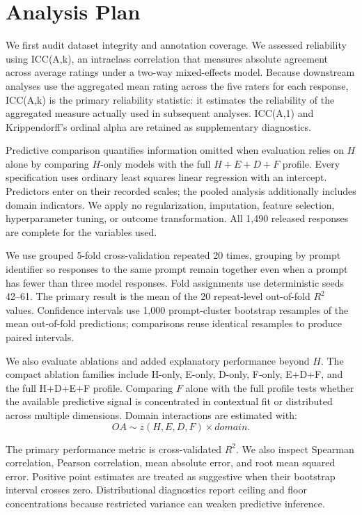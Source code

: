 \documentclass[manuscript,review,anonymous]{acmart}
\begin{document}
\section{Analysis Plan}

We first audit dataset integrity and annotation coverage. We assessed reliability using ICC(A,k), an intraclass correlation that measures absolute agreement across average ratings under a two-way mixed-effects model. Because downstream analyses use the aggregated mean rating across the five raters for each response, ICC(A,k) is the primary reliability statistic: it estimates the reliability of the aggregated measure actually used in subsequent analyses. ICC(A,1) and Krippendorff's ordinal alpha are retained as supplementary diagnostics.

Predictive comparison quantifies information omitted when evaluation relies on $H$ alone by comparing $H$-only models with the full $H+E+D+F$ profile. Every specification uses ordinary least squares linear regression with an intercept. Predictors enter on their recorded scales; the pooled analysis additionally includes domain indicators. We apply no regularization, imputation, feature selection, hyperparameter tuning, or outcome transformation. All 1,490 released responses are complete for the variables used.

We use grouped 5-fold cross-validation repeated 20 times, grouping by prompt identifier so responses to the same prompt remain together even when a prompt has fewer than three model responses. Fold assignments use deterministic seeds 42--61. The primary result is the mean of the 20 repeat-level out-of-fold $R^2$ values. Confidence intervals use 1,000 prompt-cluster bootstrap resamples of the mean out-of-fold predictions; comparisons reuse identical resamples to produce paired intervals.

We also evaluate ablations and added explanatory performance beyond $H$. The compact ablation families include H-only, E-only, D-only, F-only, E+D+F, and the full H+D+E+F profile. Comparing $F$ alone with the full profile tests whether the available predictive signal is concentrated in contextual fit or distributed across multiple dimensions. Domain interactions are estimated with:
\[
OA \sim z(H,E,D,F)\times domain.
\]

The primary performance metric is cross-validated $R^2$. We also inspect Spearman correlation, Pearson correlation, mean absolute error, and root mean squared error. Positive point estimates are treated as suggestive when their bootstrap interval crosses zero. Distributional diagnostics report ceiling and floor concentrations because restricted variance can weaken predictive inference.
\end{document}
